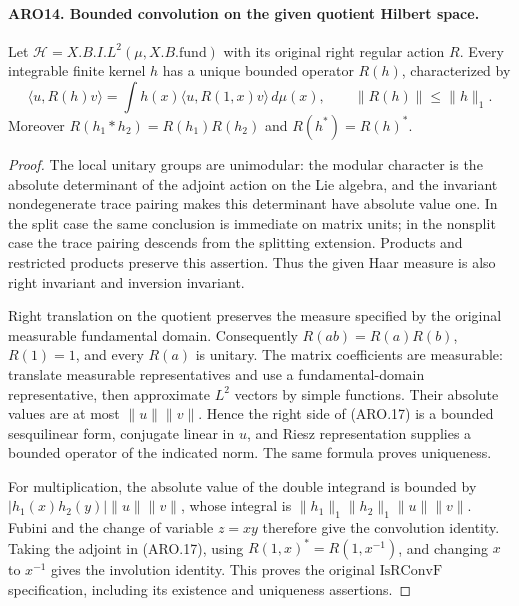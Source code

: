 \documentclass[11pt,a4paper]{article}
\numberwithin{equation}{section}
\theoremstyle{remark}\newtheorem{remark}[theorem]{Remark}
\begin{document}
\paragraph{ARO14. Bounded convolution on the given quotient Hilbert space.}
\label{claim:ARO14}
Let \(\mathcal H=X.B.I.L^2(\mu,X.B.\mathrm{fund})\) with its
original right regular action \(R\).  Every integrable finite kernel
\(h\) has a unique bounded operator \(R(h)\), characterized by
\[
 \langle u,R(h)v\rangle
       =\int h(x)\langle u,R(1,x)v\rangle\,d\mu(x),
 \qquad \|R(h)\|\leq\|h\|_1.                       \tag{ARO.17}
\]
Moreover \(R(h_1*h_2)=R(h_1)R(h_2)\) and
\(R(h^*)=R(h)^*\).
\begin{proof}
The local unitary groups are unimodular: the modular character is
the absolute determinant of the adjoint action on the Lie algebra,
and the invariant nondegenerate trace pairing makes this determinant
have absolute value one.  In the split case the same conclusion is
immediate on matrix units; in the nonsplit case the trace pairing
descends from the splitting extension.  Products and restricted
products preserve this assertion.  Thus the given Haar measure is
also right invariant and inversion invariant.

Right translation on the quotient preserves the measure specified
by the original measurable fundamental domain.  Consequently
\(R(ab)=R(a)R(b)\), \(R(1)=1\), and every \(R(a)\) is unitary.
The matrix coefficients are measurable: translate measurable
representatives and use a fundamental-domain representative,
then approximate \(L^2\) vectors by simple functions.  Their
absolute values are at most \(\|u\|\|v\|\).  Hence the right side
of (ARO.17) is a bounded sesquilinear form, conjugate linear in
\(u\), and Riesz representation supplies a bounded operator of
the indicated norm.  The same formula proves uniqueness.

For multiplication, the absolute value of the double integrand is
bounded by \(|h_1(x)h_2(y)|\|u\|\|v\|\), whose integral is
\(\|h_1\|_1\|h_2\|_1\|u\|\|v\|\).  Fubini and the change
of variable \(z=xy\) therefore give the convolution identity.
Taking the adjoint in (ARO.17), using \(R(1,x)^*=R(1,x^{-1})\),
and changing \(x\) to \(x^{-1}\) gives the involution identity.
This proves the original \(\mathrm{IsRConvF}\) specification,
including its existence and uniqueness assertions.
\end{proof}

\end{document}
